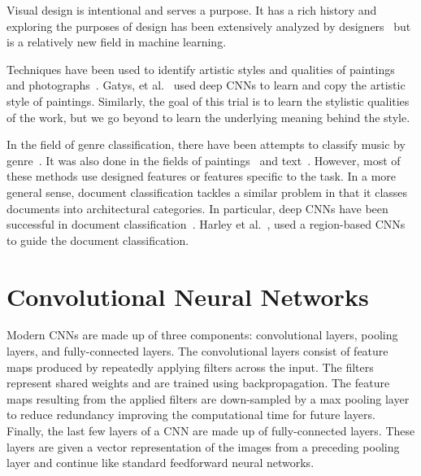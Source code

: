 \documentclass[conference]{IEEEtran}
\begin{document}
Visual design is intentional and serves a purpose.
It has a rich history and exploring the purposes of design has been extensively analyzed by designers~\cite{bookhistory} but is a relatively new field in machine learning.

Techniques have been used to identify artistic styles and qualities of paintings and photographs~\cite{karayev2013recognizing,gatys2015neural,datta2006studying,datta2008image}.
Gatys, et al.~\cite{gatys2015neural} used deep CNNs to learn and copy the artistic style of paintings.
Similarly, the goal of this trial is to learn the stylistic qualities of the work, but we go beyond to learn the underlying meaning behind the style.

In the field of genre classification, there have been attempts to classify music by genre~\cite{tzanetakis2002musical,mckay2004automatic,pye2000content}.
It was also done in the fields of paintings~\cite{zujovic2009classifying,karayev2013recognizing} and text~\cite{finn2006learning,petrenz2011stable}.
However, most of these methods use designed features or features specific to the task.
In a more general sense, document classification tackles a similar problem in that it classes documents into architectural categories.
In particular, deep CNNs have been successful in document classification~\cite{afzal2015deepdocclassifier,kang2014convolutional}.
Harley et al.~\cite{harley2015evaluation}, used a region-based CNNs to guide the document classification.

\section{Convolutional Neural Networks}
\label{cnn}
Modern CNNs are made up of three components: convolutional layers, pooling layers, and fully-connected layers. The convolutional layers consist of feature maps produced by repeatedly applying filters across the input. The filters represent shared weights and are trained using backpropagation. 
The feature maps resulting from the applied filters are down-sampled by a max pooling layer to reduce redundancy improving the computational time for future layers. 
Finally, the last few layers of a CNN are made up of fully-connected layers. 
These layers are given a vector representation of the images from a preceding pooling layer and continue like standard feedforward neural networks.
\end{document}
